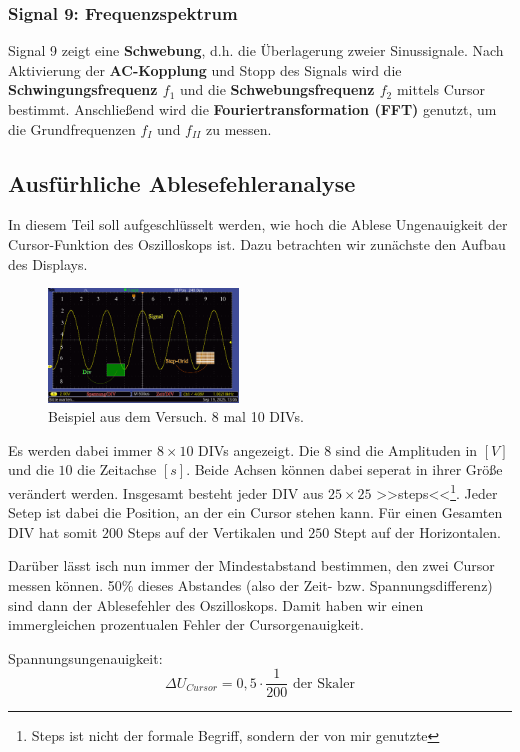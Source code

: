 \subsubsection{Signal 9: Frequenzspektrum}
Signal 9 zeigt eine \textbf{Schwebung}, d.h. die Überlagerung zweier Sinussignale. Nach Aktivierung der \textbf{AC-Kopplung} und Stopp des Signals wird die \textbf{Schwingungsfrequenz $f_1$} und die \textbf{Schwebungsfrequenz $f_2$} mittels Cursor bestimmt. Anschließend wird die \textbf{Fouriertransformation (FFT)} genutzt, um die Grundfrequenzen $f_I$ und $f_{II}$ zu messen.

\subsection*{Ausfürhliche Ablesefehleranalyse}
In diesem Teil soll aufgeschlüsselt werden, wie hoch die Ablese Ungenauigkeit der Cursor-Funktion des Oszilloskops ist. 
Dazu betrachten wir zunächste den Aufbau des Displays. 

\begin{figure} [h!]
    \centering
        \includegraphics[width=0.45\textwidth]{img/25/SinusVis.pdf}
    \caption{Beispiel aus dem Versuch. 8 mal 10 DIVs.}
\end{figure}

Es werden dabei immer $8 \times 10$ DIVs angezeigt. Die $8$ sind die Amplituden in $[V]$ und die $10$ die Zeitachse $[s]$. Beide Achsen können dabei seperat in ihrer Größe verändert werden.
Insgesamt besteht jeder DIV aus $25 \times 25$ >>steps<<\footnote{Steps ist nicht der formale Begriff, sondern der von mir genutzte}. Jeder Setep ist dabei die Position, an der ein Cursor stehen kann. 
Für einen Gesamten DIV hat somit $200$ Steps auf der Vertikalen und $250$ Stept auf der Horizontalen. 

Darüber lässt isch nun immer der Mindestabstand bestimmen, den zwei Cursor messen können. 50\% dieses Abstandes (also der Zeit- bzw. Spannungsdifferenz) sind dann der Ablesefehler des Oszilloskops.
Damit haben wir einen immergleichen prozentualen Fehler der Cursorgenauigkeit. 

Spannungsungenauigkeit:
\begin{equation}
    \Delta U_{Cursor} = 0,5 \cdot \frac{1}{200} \text{ der Skaler}
\end{equation}

